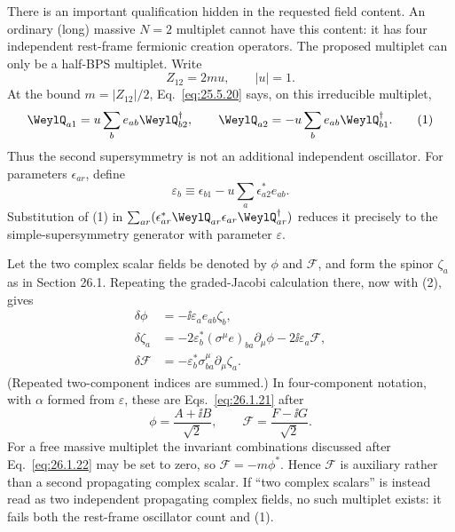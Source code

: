 \ExerciseEditorialNote

\begin{enumerate}
  There is an important qualification hidden in the requested field
  content.  An ordinary (long) massive \(N=2\) multiplet cannot have this
  content: it has four independent rest-frame fermionic creation operators.
  The proposed multiplet can only be a half-BPS multiplet.  Write
  \[
    Z_{12}=2m u,\qquad |u|=1 .
  \]
  At the bound \(m=|Z_{12}|/2\), Eq.~\eqref{eq:25.5.20} says, on this
  irreducible multiplet,
  \[
    \WeylQ_{a1}=u\sum_b e_{ab}\WeylQ_{b2}^{\dagger},
    \qquad
    \WeylQ_{a2}=-u\sum_b e_{ab}\WeylQ_{b1}^{\dagger}.
    \tag{1}
  \]
  Thus the second supersymmetry is not an additional independent oscillator.
  For parameters \(\epsilon_{ar}\), define
  \[
    \varepsilon_b\equiv
      \epsilon_{b1}-u\sum_a\epsilon_{a2}^{*}e_{ab}.
    \tag{2}
  \]
  Substitution of (1) in
  \(\sum_{ar}(\epsilon_{ar}^{*}\WeylQ_{ar}
  \epsilon_{ar}\WeylQ_{ar}^{\dagger})\) reduces it precisely to the
  simple-supersymmetry generator with parameter \(\varepsilon\).

  Let the two complex scalar fields be denoted by \(\phi\) and
  \(\mathcal F\), and form the spinor \(\zeta_a\) as in Section 26.1.
  Repeating the graded-Jacobi calculation there, now with (2), gives
  \[
  \begin{aligned}
    \delta\phi
      &=-\ii\varepsilon_a e_{ab}\zeta_b,\\
    \delta\zeta_a
      &=-2\varepsilon_b^*(\sigma^\mu e)_{ba}\partial_\mu\phi
        -2\ii\varepsilon_a\mathcal F,\\
    \delta\mathcal F
      &=-\varepsilon_b^*\sigma^\mu_{ba}\partial_\mu\zeta_a .
  \end{aligned}
  \tag{3}
  \]
  (Repeated two-component indices are summed.)  In four-component notation,
  with \(\alpha\) formed from \(\varepsilon\), these are
  Eqs.~\eqref{eq:26.1.21} after
  \[
    \phi=\frac{A+\ii B}{\sqrt2},\qquad
    \mathcal F=\frac{F-\ii G}{\sqrt2}.
  \]
  For a free massive multiplet the invariant combinations discussed after
  Eq.~\eqref{eq:26.1.22} may be set to zero, so
  \(\mathcal F=-m\phi^*\).  Hence \(\mathcal F\) is auxiliary rather than a
  second propagating complex scalar.  If ``two complex scalars'' is instead
  read as two independent propagating complex fields, no such multiplet
  exists: it fails both the rest-frame oscillator count and (1).


\end{enumerate}

